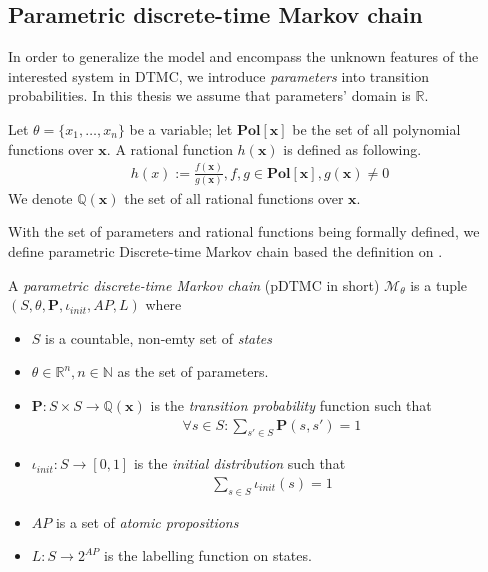 \subsection{Parametric discrete-time Markov chain}
In order to generalize the model and encompass the unknown features of the interested system in
DTMC, we introduce \textit{parameters} into transition probabilities. In this thesis we assume that
parameters' domain is $\mathbb{R}$.
\begin{definition}
      \rm
      Let $\theta=\{x_1,\ldots,x_n\}$ be a variable; let $\mathbf{Pol}[\mathbf{x}]$ be the set of
      all polynomial functions over $\mathbf{x}$. A rational function $h(\mathbf{x})$ is defined
      as following.
      \begin{align*}
            h(x) := \frac{f(\mathbf{x})}{g(\mathbf{x})}, f,g\in\mathbf{Pol}[\mathbf{x}], g(\mathbf{x}) \neq 0
      \end{align*}
      We denote $\mathbb{Q}(\mathbf{x})$ the set of all rational functions over $\mathbf{x}$.
\end{definition}
With the set of parameters and rational functions being formally defined, we define parametric
Discrete-time Markov chain based the definition on \cite{junges2019parameter}.
\begin{definition}
      \rm
      A \textit{parametric discrete-time Markov chain} (pDTMC in short) $\mathcal{M}_\theta$ is a tuple $(S, \theta,
            \mathbf{P}, \iota_{init}, AP, L)$ where
      \begin{itemize}
            \item $S$ is a countable, non-emty set of \textit{states}
            \item $\theta \in \mathbb{R}^n, n \in \mathbb{N}$ as the set of  parameters.
            \item $\mathbf{P}:S\times S \rightarrow \mathbb{Q}(\mathbf{x})$ is the \textit{transition
                        probability} function such that
                  \begin{align*}
                        \forall s \in S : \sum_{s'\in S}\mathbf{P}(s, s') = 1
                  \end{align*}
            \item $\iota_{init}: S \rightarrow [0,1]$ is the \textit{initial distribution} such that
                  \begin{align*}
                        \sum_{s\in S}\iota_{init}(s) = 1
                  \end{align*}
            \item $AP$ is a set of \textit{atomic propositions}
            \item $L: S \rightarrow 2^{AP}$ is the labelling function on states.
      \end{itemize}
\end{definition}
